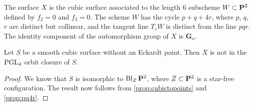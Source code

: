 \documentclass[11pt,reqno, letterpaper]{amsart}
\DeclareMathOperator{\Bl}{Bl}
\numberwithin{equation}{section}
\newcommand{\G}{\mathbf G}
\begin{document}
The surface $X$ is the cubic surface associated to the length 6 subscheme $W \subset \P^2$ defined by $f_2 = 0$ and $f_3 = 0$.
The scheme $W$ has the cycle $p + q + 4r$, where $p$, $q$, $r$ are distinct but collinear, and the tangent line $T_rW$ is distinct from the line $\overline{pqr}$.
The identity component of the automorphism group of $X$ is $\G_a$.
\begin{proposition}
  Let $S$ be a smooth cubic surface without an Eckardt point.
  Then $X$ is not in the $\PGL_4$ orbit closure of $S$.
\end{proposition}
\begin{proof}
  We know that $S$ is isomorphic to $\Bl_Z \P^2$, where $Z \subset \P^2$ is a star-free configuration.
  The result now follows from \autoref{prop:cubictopoints} and \autoref{prop:pq4r}.
\end{proof}



\end{document}
